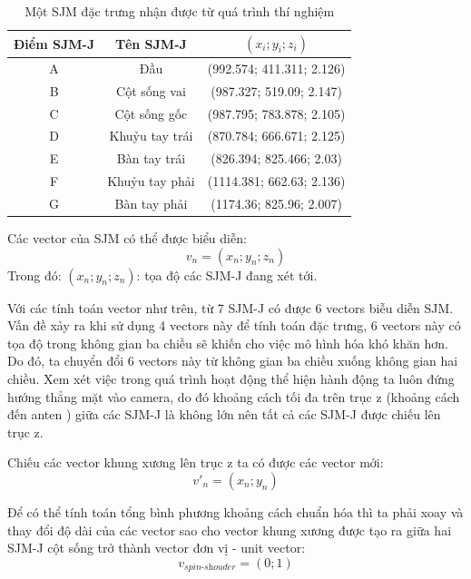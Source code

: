 \begin{table}[htbp]
\centering
\caption{Một SJM đặc trưng nhận được từ quá trình thí nghiệm}
\begin{tabular}{|c|c|c|}
\hline 
 Điểm SJM-J & Tên SJM-J & $(x_i; y_i; z_i) $\\ 
\hline 
A & Đầu  & (992.574; 411.311; 2.126) \\ 
\hline 
B & Cột sống vai & (987.327; 519.09; 2.147) \\ 
\hline 
C & Cột sống gốc & (987.795; 783.878; 2.105) \\ 
\hline 
D & Khuỷu tay trái & (870.784; 666.671; 2.125) \\ 
\hline 
E & Bàn tay trái & (826.394; 825.466; 2.03) \\ 
\hline
F & Khuỷu tay phải & (1114.381; 662.63; 2.136) \\ 
\hline
G & Bàn tay phải & (1174.36; 825.96; 2.007) \\ 
\hline 
\end{tabular} 
\label{BangSJM}
\end{table}

Các vector của SJM có thể được biểu diễn:
\begin{equation}
v_n=(x_n; y_n; z_n)
\end{equation}
Trong đó: $(x_n; y_n; z_n)$: tọa độ các SJM-J đang xét tới.

Với các tính toán vector như trên, từ 7 SJM-J có được 6 vectors biễu diễn SJM. Vấn đề xảy ra khi sử dụng 4 vectors này để tính toán đặc trưng, 6 vectors này có tọa độ trong không gian ba chiều sẽ khiến cho việc mô hình hóa khó khăn hơn. Do đó, ta chuyển đổi 6 vectors này từ không gian ba chiều xuống không gian hai chiều. Xem xét việc trong quá trình hoạt động thể hiện hành động ta luôn đứng hướng thẳng mặt vào camera, do đó khoảng cách tối đa trên trục z (khoảng cách đến anten ) giữa các SJM-J là không lớn nên tất cả các SJM-J được chiếu lên trục z.

Chiếu các vector khung xương lên trục z ta có được các vector mới:
\begin{equation}
v'_n = ({x_n}; {y_n})
\end{equation}

Để có thể tính toán tổng bình phương khoảng cách chuẩn hóa thì ta phải xoay và thay đổi độ dài của các vector sao cho vector khung xương được tạo ra giữa hai SJM-J cột sống trở thành vector đơn vị - unit vector:
\begin{equation}
v_\textit{spin-shouder} = (0;1)
\end{equation}

